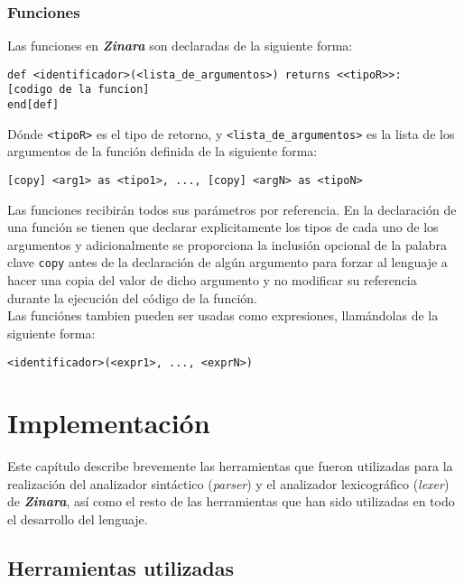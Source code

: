 \documentclass[12pt, spanish]{report}
\begin{document}
\subsection{Funciones}
\label{sec:func}

Las funciones en \emph{\textbf{Zinara}} son declaradas de la siguiente
forma:

\begin{verbatim}
def <identificador>(<lista_de_argumentos>) returns <<tipoR>>:
[codigo de la funcion]
end[def]
\end{verbatim}

Dónde \texttt{<tipoR>} es el tipo de retorno, y
\texttt{<lista\_de\_argumentos>} es la lista de los argumentos de la
función definida de la siguiente forma:

\begin{verbatim}
[copy] <arg1> as <tipo1>, ..., [copy] <argN> as <tipoN>
\end{verbatim}

Las funciones recibirán todos sus parámetros por referencia. En la
declaración de una función se tienen que declarar explicitamente los
tipos de cada uno de los argumentos y adicionalmente se proporciona la
inclusión opcional de la palabra clave \texttt{copy} antes de la
declaración de algún argumento para forzar al lenguaje a hacer una
copia del valor de dicho argumento y no modificar su referencia
durante la ejecución del código de la función.\\

Las funciónes tambien pueden ser usadas como expresiones, llamándolas
de la siguiente forma:

\begin{verbatim}
<identificador>(<expr1>, ..., <exprN>)
\end{verbatim}

\chapter{Implementación}
\label{chap:impl}

Este capítulo describe brevemente las herramientas que fueron
utilizadas para la realización del analizador sintáctico
(\emph{parser}) y el analizador lexicográfico (\emph{lexer}) de
\emph{\textbf{Zinara}}, así como el resto de las herramientas que han
sido utilizadas en todo el desarrollo del lenguaje.

\section{Herramientas utilizadas}
\label{sec:herramientas}
\end{document}
